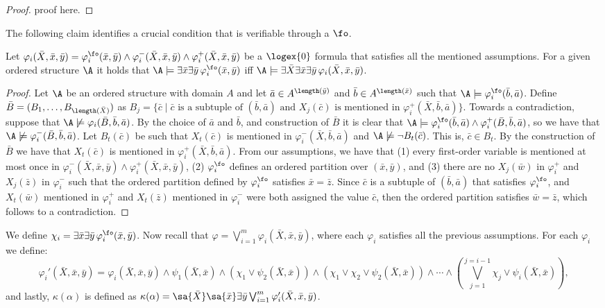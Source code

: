 \begin{proof}
	proof here.
\end{proof}
The following claim identifies a crucial condition that is verifiable through a $\fo$. 
\begin{claim}
	Let $\varphi_i(\bar{X},\bar{x},\bar{y}) = \varphi^{\fo}_i(\bar{x},\bar{y}) \wedge \varphi^{-}_i(\bar{X},\bar{x},\bar{y}) \wedge \varphi^{+}_i(\bar{X},\bar{x},\bar{y})$ be a $\logex{0}$ formula that satisfies all the mentioned assumptions. For a given ordered structure $\A$ it holds that $\A\models\exists\bar{x}\exists\bar{y}\,\varphi^{\fo}_i(\bar{x},\bar{y})$ iff $\A\models\exists\bar{X}\exists\bar{x}\exists\bar{y}\,\varphi_i(\bar{X},\bar{x},\bar{y})$.
\end{claim}
\begin{proof}
	Let $\A$ be an ordered structure with domain $A$ and let $\bar{a}\in A^{\length(\bar{y})}$ and $\bar{b}\in A^{\length(\bar{x})}$ such that $\A\models\varphi^{\fo}_i(\bar{b},\bar{a})$. Define $\bar{B} = (B_1,\ldots,B_{\length(\bar{X})})$ as $B_j = \{\bar{c}\mid\bar{c}\text{ is a subtuple of $(\bar{b},\bar{a})$ and $X_j(\bar{c})$ is mentioned in $\varphi^{+}_i(\bar{X},\bar{b},\bar{a})$}\}$. Towards a contradiction, suppose that $\A\not\models\varphi_i(\bar{B},\bar{b},\bar{a})$. By the choice of $\bar{a}$ and $\bar{b}$, and construction of $\bar{B}$ it is clear that $\A\models\varphi^{\fo}_i(\bar{b},\bar{a})\wedge\varphi^{+}_i(\bar{B},\bar{b},\bar{a})$, so we have that $\A\not\models\varphi^{-}_i(\bar{B},\bar{b},\bar{a})$. Let $B_t(\bar{c})$ be such that $X_t(\bar{c})$ is mentioned in $\varphi^{-}_i(\bar{X},\bar{b},\bar{a})$ and $\A\not\models\neg B_t(\bar{c})$. This is, $\bar{c}\in B_t$. By the construction of $\bar{B}$ we have that $X_t(\bar{c})$ is mentioned in $\varphi^{+}_i(\bar{X},\bar{b},\bar{a})$. From our assumptions, we have that (1) every first-order variable is mentioned at most once in $\varphi^{-}_i(\bar{X},\bar{x},\bar{y}) \wedge \varphi^{+}_i(\bar{X},\bar{x},\bar{y})$, (2) $\varphi^{\fo}_i$ defines an ordered partition over $(\bar{x},\bar{y})$, and (3) there are no $X_j(\bar{w})$ in $\varphi^{+}_i$ and $X_j(\bar{z})$ in $\varphi^{-}_i$ such that the ordered partition defined by $\varphi^{\fo}_i$ satisfies $\bar{x} = \bar{z}$. Since $\bar{c}$ is a subtuple of $(\bar{b},\bar{a})$ that satisfies $\varphi^{\fo}_i$, and $X_t(\bar{w})$ mentioned in $\varphi^{+}_i$ and $X_t(\bar{z})$ mentioned in $\varphi^{-}_i$ were both assigned the value $\bar{c}$, then the ordered partition satisfies $\bar{w} = \bar{z}$, which follows to a contradiction.
\end{proof}
We define $\chi_i = \exists\bar{x}\exists\bar{y}\,\varphi^{\fo}_i(\bar{x},\bar{y})$. Now recall that $\varphi = \bigvee_{i = 1}^m\varphi_i(\bar{X},\bar{x},\bar{y})$, where each $\varphi_i$ satisfies all the previous assumptions. For each $\varphi_i$ we define:
$$
\varphi_i'(\bar{X},\bar{x},\bar{y}) = \varphi_i(\bar{X},\bar{x},\bar{y})\wedge\psi_1(\bar{X},\bar{x})\wedge(\chi_1\vee\psi_2(\bar{X},\bar{x}))\wedge(\chi_1\vee\chi_2\vee\psi_2(\bar{X},\bar{x}))\wedge\cdots\wedge(
\bigvee_{j = 1}^{j = i-1}\chi_j\vee\psi_i(\bar{X},\bar{x})),
$$
and lastly, $\kappa(\alpha)$ is defined as $\kappa(\alpha) = \sa{\bar{X}}\sa{\bar{x}}\exists\bar{y}\bigvee_{i = 1}^m\varphi_i'(\bar{X},\bar{x},\bar{y})$.

